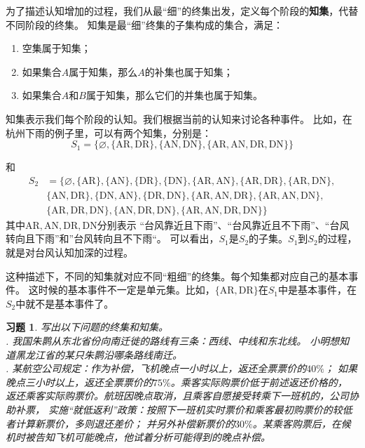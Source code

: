 \documentclass[12pt,UTF8]{ctexbook}
\newtheorem{xt}{习题}[section]
\begin{document}
为了描述认知增加的过程，我们从最“细”的终集出发，定义每个阶段的\textbf{知集}，代替不同阶段的终集。
知集是最“细”终集的子集构成的集合，满足：

\begin{enumerate}
    \item 空集属于知集；
    \item 如果集合$A$属于知集，那么$A$的补集也属于知集；
    \item 如果集合$A$和$B$属于知集，那么它们的并集也属于知集。
\end{enumerate}

知集表示我们每个阶段的认知。我们根据当前的认知来讨论各种事件。
比如，在杭州下雨的例子里，可以有两个知集，分别是：
$$ S_1 = \big\{\varnothing, \{\mbox{AR}, \mbox{DR}\},\{\mbox{AN}, \mbox{DN}\}, \{\mbox{AR}, \mbox{AN}, \mbox{DR}, \mbox{DN}\} \big\}$$

和
\begin{align*}
    S_2 &= \big\{ \varnothing, \{\mbox{AR}\}, \{\mbox{AN}\}, \{\mbox{DR}\}, \{\mbox{DN}\}, \{\mbox{AR}, \mbox{AN}\}, \{\mbox{AR}, \mbox{DR}\}, \{\mbox{AR}, \mbox{DN}\},  \\
    & \{\mbox{AN}, \mbox{DR}\}, \{\mbox{DN}, \mbox{AN}\}, \{\mbox{DR}, \mbox{DN}\},  \{\mbox{AR}, \mbox{AN}, \mbox{DR}\}, \{\mbox{AR}, \mbox{AN}, \mbox{DN}\},  \\
    &  \{\mbox{AR}, \mbox{DR}, \mbox{DN}\},  \{\mbox{AN}, \mbox{DR}, \mbox{DN}\}, \{\mbox{AR}, \mbox{AN}, \mbox{DR}, \mbox{DN}\} \big\}  
\end{align*}
其中$\mbox{AR}, \mbox{AN}, \mbox{DR}, \mbox{DN}$分别表示
“台风靠近且下雨”、“台风靠近且不下雨”、“台风转向且下雨”和”台风转向且不下雨“。
可以看出，$S_1$是$S_2$的子集。$S_1$到$S_2$的过程，就是对台风认知加深的过程。

这种描述下，不同的知集就对应不同“粗细”的终集。每个知集都对应自己的基本事件。
这时候的基本事件不一定是单元集。比如，$\{\mbox{AR}, \mbox{DR}\}$在$S_1$中是基本事件，在$S_2$中就不是基本事件了。

\begin{xt}
    写出以下问题的终集和知集。\\
    . 我国朱鹮从东北省份向南迁徙的路线有三条：西线、中线和东北线。
    小明想知道黑龙江省的某只朱鹮沿哪条路线南迁。\\
    . 某航空公司规定：作为补偿，飞机晚点一小时以上，返还全票票价的$40\%$；
    如果晚点三小时以上，返还全票票价的$75\%$。乘客实际购票价低于前述返还价格的，
    返还乘客实际购票价。航班因晚点取消，且乘客自愿接受转乘下一班机的，公司协助补票，
    实施“就低返利”政策：按照下一班机实时票价和乘客最初购票价的较低者计算新票价，多则退还差价；
    并另外补偿新票价的$30\%$。某乘客购票后，在候机时被告知飞机可能晚点，他试着分析可能得到的晚点补偿。
\end{xt}
\end{document}
